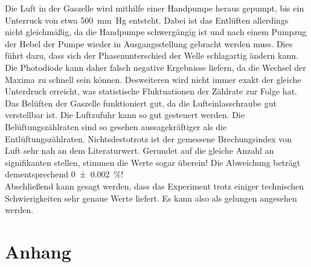 \noindent Die Luft in der Gaszelle wird mithilfe einer Handpumpe heraus gepumpt, bis ein Unterruck von etwa 
\qty{500}{\milli \meter Hg} entsteht. Dabei ist das Entlüften allerdings nicht gleichmäßig, da die Handpumpe 
schwergängig ist und nach einem Pumpzug der Hebel der Pumpe wieder in Ausgangsstellung gebracht werden muss. 
Dies führt dazu, dass sich der Phasenunterschied der Welle schlagartig ändern kann. Die Photodiode kann daher 
falsch negative Ergebnisse liefern, da die Wechsel der Maxima zu schnell sein können. 
Desweiteren wird nicht immer exakt der gleiche Unterdruck erreicht, was statistische Fluktuationen der Zählrate 
zur Folge hat. Das Belüften der Gaszelle funktioniert gut, da die Lufteinlasschraube gut verstellbar ist. Die 
Luftzufuhr kann so gut gesteuert werden. Die Belüftungszählraten sind so gesehen aussagekräftiger als die 
Entlüftungszählraten.
Nichtsdestotrotz ist der gemessene Brechungsindex von Luft sehr nah an dem Literaturwert. Gerundet auf die gleiche 
Anzahl an signifikanten stellen, stimmen die Werte sogar überein! Die Abweichung beträgt dementsprechend 
\qty{0\pm0.002}{\percent}!\\

Abschließend kann gesagt werden, dass das Experiment trotz einiger technischen Schwierigkeiten sehr genaue 
Werte liefert. Es kann also als gelungen angesehen werden.




\section{Anhang}

